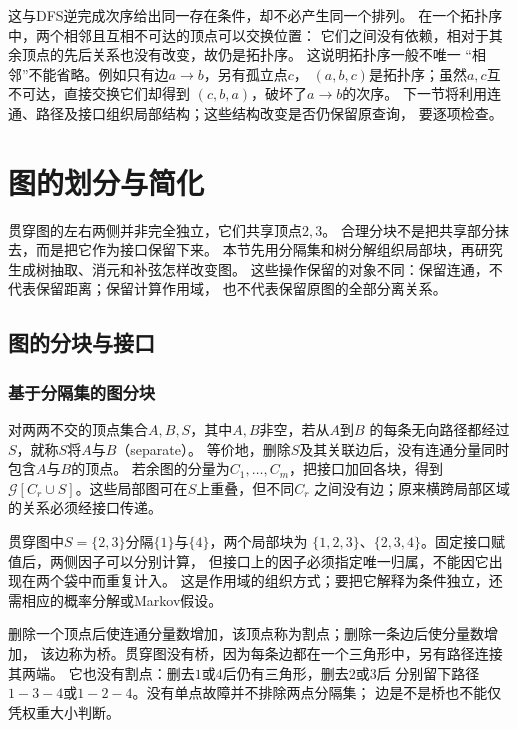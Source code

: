 这与DFS逆完成次序给出同一存在条件，却不必产生同一个排列。
在一个拓扑序中，两个相邻且互相不可达的顶点可以交换位置：
它们之间没有依赖，相对于其余顶点的先后关系也没有改变，故仍是拓扑序。
这说明拓扑序一般不唯一
“相邻”不能省略。例如只有边\(a\to b\)，另有孤立点\(c\)，
\((a,b,c)\)是拓扑序；虽然\(a,c\)互不可达，直接交换它们却得到
\((c,b,a)\)，破坏了\(a\to b\)的次序。
下一节将利用连通、路径及接口组织局部结构；这些结构改变是否仍保留原查询，
要逐项检查。

\section{图的划分与简化}
\label{sec:graph-theory-traversal-separation-decomposition}

贯穿图的左右两侧并非完全独立，它们共享顶点\(2,3\)。
合理分块不是把共享部分抹去，而是把它作为接口保留下来。
本节先用分隔集和树分解组织局部块，再研究生成树抽取、消元和补弦怎样改变图。
这些操作保留的对象不同：保留连通，不代表保留距离；保留计算作用域，
也不代表保留原图的全部分离关系。

\subsection{图的分块与接口}

\subsubsection{基于分隔集的图分块}
\label{sec:graph-theory-separators}

对两两不交的顶点集合\(A,B,S\)，其中\(A,B\)非空，若从\(A\)到\(B\)
的每条无向路径都经过\(S\)，就称\(S\)将\(A\)与\(B\)（separate）。
等价地，删除\(S\)及其关联边后，没有连通分量同时包含\(A\)与\(B\)的顶点。
若余图的分量为\(C_1,\ldots,C_m\)，把接口加回各块，得到
\(\mathcal G[C_r\cup S]\)。这些局部图可在\(S\)上重叠，但不同\(C_r\)
之间没有边；原来横跨局部区域的关系必须经接口传递。

贯穿图中\(S=\{2,3\}\)分隔\(\{1\}\)与\(\{4\}\)，两个局部块为
\(\{1,2,3\}\)、\(\{2,3,4\}\)。固定接口赋值后，两侧因子可以分别计算，
但接口上的因子必须指定唯一归属，不能因它出现在两个袋中而重复计入。
这是作用域的组织方式；要把它解释为条件独立，还需相应的概率分解或Markov假设。

删除一个顶点后使连通分量数增加，该顶点称为割点；删除一条边后使分量数增加，
该边称为桥。贯穿图没有桥，因为每条边都在一个三角形中，另有路径连接其两端。
它也没有割点：删去\(1\)或\(4\)后仍有三角形，删去\(2\)或\(3\)后
分别留下路径\(1-3-4\)或\(1-2-4\)。没有单点故障并不排除两点分隔集；
边是不是桥也不能仅凭权重大小判断。

